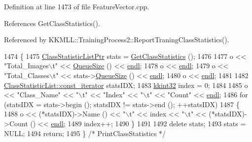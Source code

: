 Definition at line 1473 of file Feature\+Vector.\+cpp.



References Get\+Class\+Statistics().



Referenced by K\+K\+M\+L\+L\+::\+Training\+Process2\+::\+Report\+Traning\+Class\+Statistics().


\begin{DoxyCode}
1474 \{
1475   \hyperlink{class_k_k_m_l_l_1_1_class_statistic_list}{ClassStatisticListPtr}  stats = \hyperlink{class_k_k_m_l_l_1_1_feature_vector_list_a25d68202689dd6400dcf9a3b18fd5ad9}{GetClassStatistics} ();
1476 
1477   o << \textcolor{stringliteral}{"Total\_Images\(\backslash\)t"}  << \hyperlink{class_k_k_b_1_1_k_k_queue_a1dab601f75ee6a65d97f02bddf71c40d}{QueueSize} ()    << \hyperlink{namespace_k_k_b_ad1f50f65af6adc8fa9e6f62d007818a8}{endl};
1478   o << \hyperlink{namespace_k_k_b_ad1f50f65af6adc8fa9e6f62d007818a8}{endl}; 
1479   o << \textcolor{stringliteral}{"Total\_Classes\(\backslash\)t"} << stats->\hyperlink{class_k_k_b_1_1_k_k_queue_a1dab601f75ee6a65d97f02bddf71c40d}{QueueSize} () << \hyperlink{namespace_k_k_b_ad1f50f65af6adc8fa9e6f62d007818a8}{endl};
1480   o << \hyperlink{namespace_k_k_b_ad1f50f65af6adc8fa9e6f62d007818a8}{endl};
1481 
1482   \hyperlink{class_k_k_b_1_1_k_k_queue_aeb057c9c010446f46f57c1e355f981f1}{ClassStatisticList::const\_iterator}  statsIDX;
1483   \hyperlink{namespace_k_k_b_a8fa4952cc84fda1de4bec1fbdd8d5b1b}{kkint32}  index = 0;
1484 
1485   o << \textcolor{stringliteral}{"Class\_Name"} << \textcolor{stringliteral}{"\(\backslash\)t"} << \textcolor{stringliteral}{"Index"} << \textcolor{stringliteral}{"\(\backslash\)t"} << \textcolor{stringliteral}{"Count"} << \hyperlink{namespace_k_k_b_ad1f50f65af6adc8fa9e6f62d007818a8}{endl};
1486   \textcolor{keywordflow}{for}  (statsIDX = stats->begin (); statsIDX != stats->end ();  ++statsIDX)
1487   \{
1488     o << (*statsIDX)->Name () << \textcolor{stringliteral}{"\(\backslash\)t"} << index << \textcolor{stringliteral}{"\(\backslash\)t"} << (*statsIDX)->Count () << 
      \hyperlink{namespace_k_k_b_ad1f50f65af6adc8fa9e6f62d007818a8}{endl};
1489     index++;
1490   \}
1491 
1492   \textcolor{keyword}{delete}  stats;
1493   stats = NULL;
1494   \textcolor{keywordflow}{return};
1495 \}  \textcolor{comment}{/* PrintClassStatistics */}
\end{DoxyCode}
